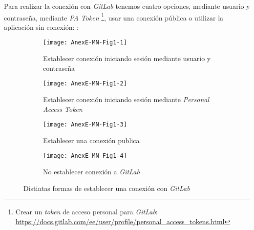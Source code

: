 Para realizar la conexión con \textit{GitLab} tenemos cuatro opciones, mediante usuario y contraseña, mediante \textit{PA Token}  \footnote{Crear un \textit{token} de acceso personal para \textit{GitLab}: \url{https://docs.gitlab.com/ee/user/profile/personal_access_tokens.html}}, usar una conexión pública o utilizar la aplicación sin conexión:
		\label{fig:dialogo-conexion_token}:\\

\begin{figure}[!h]
	\centering
	\begin{subfigure}{.45\textwidth}
		\centering
		\texttt{[image: AnexE-MN-Fig1-1]}
		\caption{Establecer conexión iniciando sesión mediante usuario y contraseña}
		\label{fig:dialogo-conexion_contraseña}
	\end{subfigure}\hfill
	\begin{subfigure}{.45\textwidth}
		\centering
		\texttt{[image: AnexE-MN-Fig1-2]}
		\caption{Establecer conexión iniciando sesión mediante \textit{Personal Access Token}}
	\end{subfigure}
	\begin{subfigure}{.45\textwidth}
		\centering
		\texttt{[image: AnexE-MN-Fig1-3]}
		\caption{Establecer una conexión publica}
		\label{fig:dialogo-conexion_publica}
	\end{subfigure}\hfill
	\begin{subfigure}{.45\textwidth}
		\centering
		\texttt{[image: AnexE-MN-Fig1-4]}
		\caption{No establecer conexión a \textit{GitLab}}
		\label{fig:dialogo-conexion_sin-conexion}
	\end{subfigure}
	\caption{Distintas formas de establecer una conexión con \textit{GitLab}}
	\label{fig:AnexE-MN-Fig1}
\end{figure}

